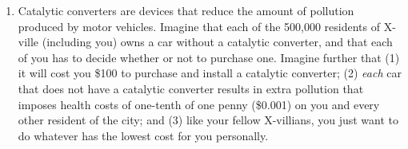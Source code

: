 \documentclass[twoside]{article}
\begin{document}
\begin{enumerate}
\begin{comment}
\end{KEY}

    \item (5 points) This cake-cutting game has something in common with such real-world phenomena as labor disputes or lawsuits in that delay hurts both sides: the longer the strike or lawsuit drags on, the worse off the various players are. As in the game above, settlement in round 1 is the only way to reach an outcome that is Pareto (circle one: \ \ efficient \ \ inefficient \ \ ). What does the Coase theorem have to say about \emph{when} such conflicts are likely to be resolved? Give an example of what the Coase theorem predicts using labor disputes or lawsuits. (Recall the essence of the Coase theorem: ``If there is nothing to stop people from trading, nothing will stop people from trading.")
    \begin{EXAM}\clearpage\end{EXAM}

\begin{KEY}
Settlement in round 1 results in a Pareto efficient outcome. The Coase theorem indicates that there is a strong incentive for both sides to settle these games in round 1 in order to reach a Pareto efficient outcome. In other words, there is a strong incentive to negotiate a labor agreement before a strike happens, or to settle a lawsuit before it goes to trial. \clearpage
\end{KEY}
    \end{enumerate}

\end{comment}














\item \begin{EXAM} Catalytic converters are devices that reduce the amount of pollution produced by motor vehicles. Imagine that each of the 500,000 residents of X-ville (including you) owns a car without a catalytic converter, and that each of you has to decide whether or not to purchase one. Imagine further that (1) it will cost you \$100 to purchase and install a catalytic converter; (2) \emph{each} car that does not have a catalytic converter results in extra pollution that imposes health costs of one-tenth of one penny (\$0.001) on you and every other resident of the city; and (3) like your fellow X-villians, you just want to do whatever has the lowest cost for you personally. \end{EXAM}


\end{enumerate}
\end{document}
